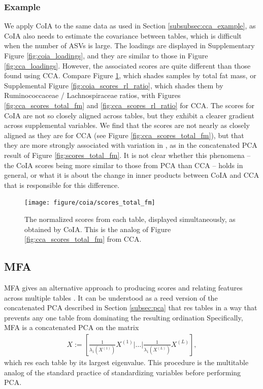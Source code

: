 \documentclass[14pt]{extarticle}
\begin{document}
\subsubsection{Example}
\label{subsubsec:coia_example}

We apply CoIA to the same data as used in Section \ref{subsubsec:cca_example},
as CoIA also needs to estimate the covariance between tables, which is difficult
when the number of ASVs is large. The loadings are displayed in Supplementary
Figure \ref{fig:coia_loadings}, and they are similar to those in Figure
\ref{fig:cca_loadings}. However, the associated scores are quite different than
those found using CCA. Compare Figure \ref{fig:coia_scores_total_fm}, which
shades samples by total fat mass, or Supplemental Figure
\ref{fig:coia_scores_rl_ratio}, which shades them by Ruminococcaceae /
Lachnospiraceae ratios, with Figures \ref{fig:cca_scores_total_fm} and
\ref{fig:cca_scores_rl_ratio} for CCA. The scores for CoIA are not so closely
aligned across tables, but they exhibit a clearer gradient across supplemental
variables. We find that the scores are not nearly as closely aligned as they are
for CCA (see Figure \ref{fig:cca_scores_total_fm}), but that they are more
strongly associated with variation in , as in the concatenated PCA result of
Figure \ref{fig:scores_total_fm}. It is not clear whether this phenomena -- the
CoIA scores being more similar to those from PCA than CCA -- holds in general,
or what it is about the change in inner products between CoIA and CCA that is
responsible for this difference.

\begin{figure}
  \centering
  \texttt{[image: figure/coia/scores\_total\_fm]}
  \caption{The normalized scores from each table, displayed
    simultaneously, as obtained by CoIA. This is the analog of Figure
    \ref{fig:cca_scores_total_fm} from CCA. \label{fig:coia_scores_total_fm} }
\end{figure}


\subsection{MFA}
\label{subsec:mfa}

MFA gives an alternative approach to producing scores and relating features
across multiple tables \citep{pages2014multiple}. It can be understood as a
reed version of the concatenated PCA described in Section \ref{subsec:pca}
that res tables in a way that prevents any one table from dominating the
resulting ordination Specifically, MFA is a concatenated PCA on the matrix
\begin{align*}
X := \left[\frac{1}{\lambda_{1}\left(X^{(1)}\right)}X^{(1)} \vert \dots
  \vert \frac{1}{\lambda_{1}\left(X^{(L)}\right)}X^{(L)}\right],
\end{align*}
which res each table by its largest eigenvalue. This procedure is the
multitable analog of the standard practice of standardizing variables before
performing PCA.
\end{document}

